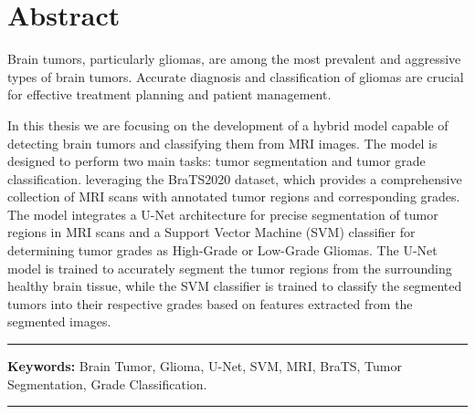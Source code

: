 \chapter*{\hfill Abstract \hfill}

Brain tumors, particularly gliomas, are among the most prevalent and aggressive types of brain tumors. Accurate diagnosis and classification of gliomas are crucial for effective treatment planning and patient management.

In this thesis we are focusing on the development of a hybrid model capable of detecting brain tumors and classifying them from MRI images. The model is designed to perform two main tasks: tumor segmentation and tumor grade classification.  leveraging the BraTS2020 dataset, which provides a comprehensive collection of MRI scans with annotated tumor regions and corresponding grades. The model integrates a U-Net architecture for precise segmentation of tumor regions in MRI scans and a Support Vector Machine (SVM) classifier for determining tumor grades as High-Grade or Low-Grade Gliomas. The U-Net model is trained to accurately segment the tumor regions from the surrounding healthy brain tissue, while the SVM classifier is trained to classify the segmented tumors into their respective grades based on features extracted from the segmented images.


\noindent\rule{\textwidth}{0.2pt}
\textbf{Keywords:} Brain Tumor, Glioma,  U-Net, SVM, MRI, BraTS, Tumor Segmentation, Grade Classification.\\
\noindent\rule{\textwidth}{0.2pt}
